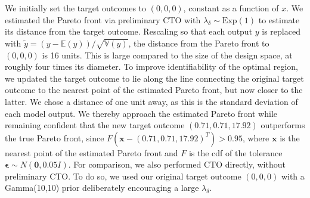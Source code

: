 \documentclass[12pt]{article}
\begin{document}
We initially set the target outcomes to $(0,0,0)$, constant as a function of $x$. 
%
We estimated the Pareto front via preliminary CTO with $\lambda_\delta\sim \mathrm{Exp}(1)$ to estimate its distance from the target outcome.
%
%
Rescaling so that each output $y$ is replaced with $\tilde y=(y-\mathbb E(y))/\sqrt{\mathbb V(y)}$, the distance from the Pareto front to $(0,0,0)$ is 16 units.
%
This is large compared to the size of the design space, at roughly four times its diameter.
%
%
%
To improve identifiability of the optimal region, we updated the target outcome to lie along the line connecting the original target outcome to the nearest point of the estimated Pareto front, but now closer to the latter.
%
We chose a distance of one unit away, as this is the standard deviation of each model output.
%
We thereby approach the estimated Pareto front while remaining confident that the new target outcome $(0.71, 0.71, 17.92)$ outperforms the true Pareto front, 
%
since $F(\mathbf x-(0.71,0.71,17.92)^T)>0.95$, where $\mathbf x$ is the nearest point of the estimated Pareto front and $F$ is the cdf of the tolerance $\boldsymbol\epsilon\sim N(\mathbf 0, 0.05I)$.
%
%
%
For comparison, we also performed CTO directly, without preliminary CTO.
%
To do so, we used our original target outcome $(0,0,0)$ with a Gamma(10,10) prior deliberately encouraging a large $\lambda_\delta$.
%
%
\end{document}
